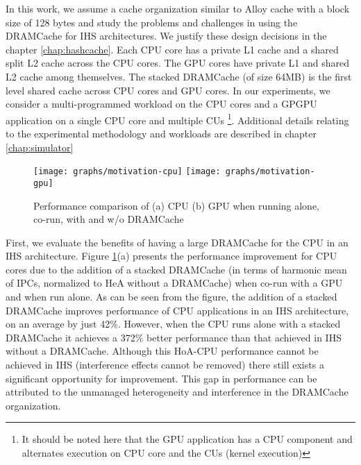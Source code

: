 \par In this work, we assume a cache organization similar to Alloy cache \cite{alloy} with a block size of 128 bytes and study the problems and challenges in using the DRAMCache for IHS architectures. We justify these design decisions in the chapter \ref{chap:hashcache}. 
Each CPU core has a private L1 cache and a shared split L2 cache across the CPU cores. The GPU cores have private L1 and shared L2 cache among themselves.  
The stacked DRAMCache (of size 64MB) is the first level shared cache across CPU cores and GPU cores. In our experiments, we consider a multi-programmed workload on the CPU cores and a GPGPU application on a single CPU core and multiple CUs 
\footnote{It should be noted here that the GPU application has a CPU component and alternates execution on CPU core and the CUs (kernel execution)}. 
Additional details relating to the experimental methodology and workloads are described in chapter \ref{chap:simulator}


\begin{figure}[htbp]
	\centering
	\texttt{[image: graphs/motivation-cpu]}
	\texttt{[image: graphs/motivation-gpu]}
	\caption{Performance comparison of (a) CPU (b) GPU when running alone, co-run, with and w/o DRAMCache}
	\label{fig:motivation}
\end{figure}


\par First, we evaluate the benefits of having a large DRAMCache for the CPU in an IHS architecture. Figure \ref{fig:motivation}(a) presents the performance improvement for CPU cores due to the addition of a stacked DRAMCache (in terms of harmonic mean of IPCs, normalized to HeA without a DRAMCache) when co-run with a GPU and when run alone.
As can be seen from the figure, the addition of a stacked DRAMCache improves performance of CPU applications in an IHS architecture, on an average by just 42\%. However, when the CPU runs alone with a stacked DRAMCache it achieves a 372\% better performance than that achieved in IHS without a DRAMCache. 
Although this HoA-CPU performance cannot be achieved in IHS (interference effects cannot be removed) there still exists a significant opportunity for improvement.
This gap in performance can be attributed to the unmanaged heterogeneity and interference in the DRAMCache organization.

